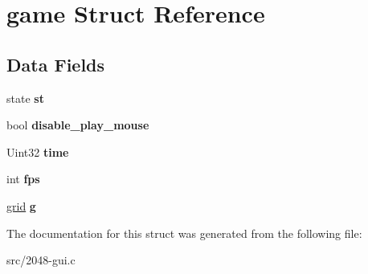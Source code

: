 \hypertarget{structgame}{\section{game Struct Reference}
\label{structgame}
}
\subsection*{Data Fields}
\begin{DoxyCompactItemize}
\item 
\hypertarget{structgame_a60c994e03ddcb50275031e127be48675}{state {\bfseries st}}\label{structgame_a60c994e03ddcb50275031e127be48675}

\item 
\hypertarget{structgame_ac84c9666de32e42c128c981417944fad}{bool {\bfseries disable\-\_\-play\-\_\-mouse}}\label{structgame_ac84c9666de32e42c128c981417944fad}

\item 
\hypertarget{structgame_a7f6e6557db254e1b678dfd614a9d76e6}{Uint32 {\bfseries time}}\label{structgame_a7f6e6557db254e1b678dfd614a9d76e6}

\item 
\hypertarget{structgame_a45b67662d620a977a2cfe519f7ab6273}{int {\bfseries fps}}\label{structgame_a45b67662d620a977a2cfe519f7ab6273}

\item 
\hypertarget{structgame_ae20731f42f06e1ac0d7a3a35e7126a46}{\hyperlink{grid_8h_a1de57b3be5a7cf6542078fcb2fd1e042}{grid} {\bfseries g}}\label{structgame_ae20731f42f06e1ac0d7a3a35e7126a46}

\end{DoxyCompactItemize}


The documentation for this struct was generated from the following file\-:\begin{DoxyCompactItemize}
\item 
src/2048-\/gui.\-c\end{DoxyCompactItemize}
